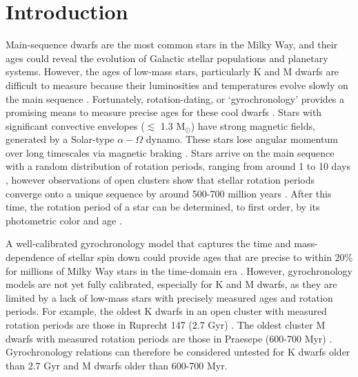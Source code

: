 \section{Introduction}

Main-sequence dwarfs are the most common stars in the Milky Way, and their
ages could reveal the evolution of Galactic stellar populations and planetary
systems.
However, the ages of low-mass stars, particularly K and M dwarfs are difficult
to measure because their luminosities and temperatures evolve slowly on the
main sequence \citep[see][for a review of stellar ages]{soderblom2010}.
Fortunately, rotation-dating, or `gyrochronology’ provides a promising means
to measure precise ages for these cool dwarfs
\citep[\eg][]{schatzman1962, weber1967, kraft1967, skumanich1972, kawaler1988,
pinsonneault1989, barnes2003, barnes2007, mamajek2008, barnes2010, meibom2011,
epstein2014, meibom2015, vansaders2016, vansaders2018, claytor2020}.
Stars with significant convective envelopes ($\lesssim$ 1.3 M$_\odot$) have
strong magnetic fields, generated by a Solar-type $\alpha-\Omega$ dynamo.
These stars lose angular momentum over long timescales via magnetic braking
\citep[\eg][]{schatzman1962, weber1967, kraft1967, skumanich1972, kawaler1988,
pinsonneault1989}.
Stars arrive on the main sequence with a random distribution of rotation
periods, ranging from around 1 to 10 days \citep{rebull2019}, however
observations of open clusters show that stellar rotation periods
converge onto a unique sequence by around 500-700 million years
\citep[\eg][]{irwin2009, gallet2013}.
After this time, the rotation period of a star can be determined, to first
order, by its photometric color and age \citep[\eg]{barnes2003, barnes2007,
barnes2010, meibom2011, meibom2015}.

A well-calibrated gyrochronology model that captures the time and
mass-dependence of stellar spin down could provide ages that are precise to
within 20\% for millions of Milky Way stars in the time-domain era
\citep{epstein2014, najita2016, angus2019, claytor2020}.
However, gyrochronology models are not yet fully calibrated, especially for K
and M dwarfs, as they are limited by a lack of low-mass stars with precisely
measured ages and rotation periods.
For example, the oldest K dwarfs in an open cluster with measured rotation
periods are those in Ruprecht 147 (2.7 Gyr) \citep{curtis2020, age_citation}.
The oldest cluster M dwarfs with measured rotation periods are those in
Praesepe (600-700 Myr) \citep{douglas2017, rebull2017, age_citation}.
Gyrochronology relations can therefore be considered untested for K dwarfs
older than 2.7 Gyr and M dwarfs older than 600-700 Myr.

